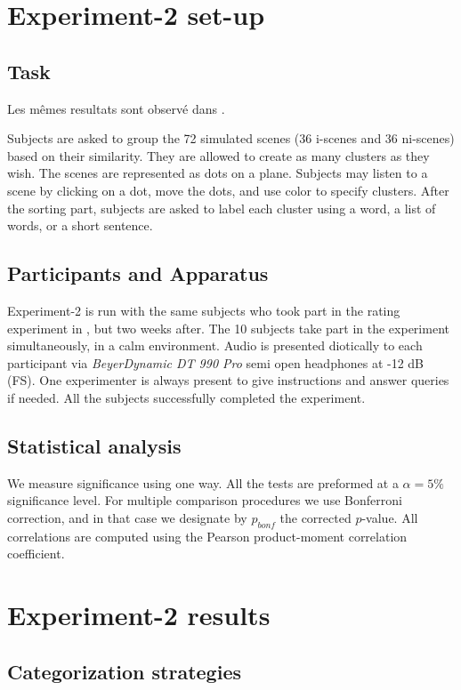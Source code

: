 \documentclass[twoside,twocolumn]{article}
\begin{document}
 

\section{Experiment-2 set-up}
\subsection{Task}
Les mêmes resultats sont observé dans \cite{guyot2005urban, ricciardi2015sound}.

Subjects are asked to group the 72 simulated scenes (36 i-scenes and 36 ni-scenes) based on their similarity. They are allowed to create as many clusters as they wish. The scenes are represented as dots on a plane. Subjects may listen to a scene by clicking on a dot, move the dots, and use color to specify clusters. After the  sorting part, subjects are asked to label each cluster using a word, a list of words, or a short sentence. 

\subsection{Participants and Apparatus}

Experiment-2 is run with the same subjects who took part in the rating experiment in \cite{lafayPartI}, but two weeks after. The 10 subjects  take part in the experiment simultaneously, in a calm environment. Audio is presented diotically to each participant via \textit{BeyerDynamic DT 990 Pro} semi open headphones at -12 dB (FS). One experimenter is always present to give instructions and answer queries if needed. All the subjects successfully completed the experiment.  

\subsection{Statistical analysis}

We measure significance using one way. All the tests are preformed at a $\alpha=5\%$ significance level. For multiple comparison procedures we use Bonferroni correction, and in that case we designate by $p_{bonf}$  the corrected $p$-value. All correlations are computed using the Pearson product-moment correlation coefficient.

\section{Experiment-2 results}
\subsection{Categorization strategies}
\end{document}
